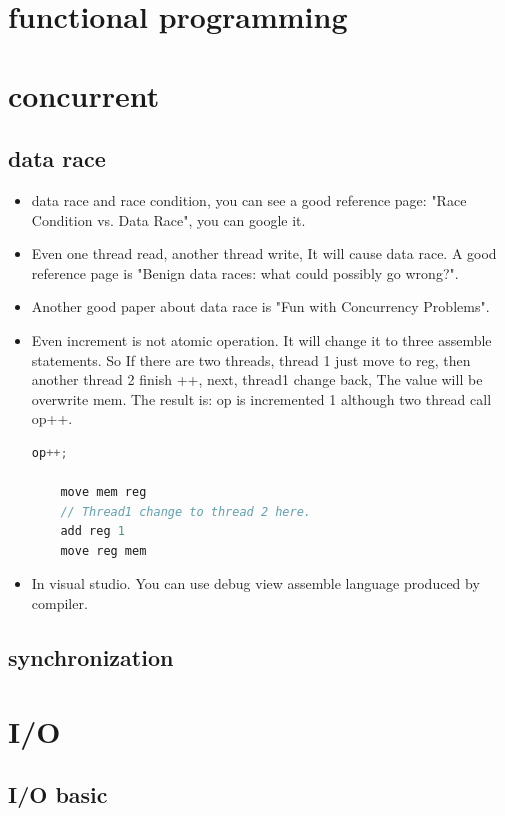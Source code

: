 \documentclass[a4paper,11pt,twoside]{book}
\begin{document}
\chapter{functional programming}

\chapter{concurrent}
\section{data race}
\begin{itemize}
	\item data race and race condition, you can see a good reference page: "Race Condition vs. Data Race", you can google it.
	
	\item Even one thread read, another thread write, It will cause data race. A good reference page is "Benign data races: what could possibly go wrong?". 
	
	\item Another good paper about data race is "Fun with Concurrency Problems".
	
	\item Even increment is not atomic operation. It will change it to three assemble statements. So If there are two threads, thread 1 just move to reg, then another thread 2 finish ++, next, thread1 change back, The value will be overwrite mem. The result is: op is incremented 1 although two thread call op++.
	\begin{lstlisting}[frame=single, language=c++]
	op++;
	
	move mem reg
	// Thread1 change to thread 2 here. 
	add reg 1
	move reg mem
	\end{lstlisting}
	
	\item In visual studio. You can use debug view assemble language produced by compiler. 
\end{itemize}

\section{synchronization}

\chapter{I/O}
\section{I/O basic}
\end{document}
